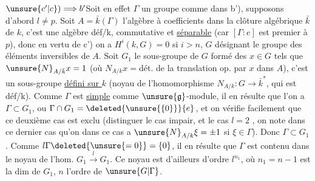 
$\unsure{c'|c})\Longrightarrow b'$\quad Soit en effet $\Gamma$ un groupe comme dans b'), supposons d'abord $l\ne p$.
Soit $A=\bar k(\Gamma)$ l'algèbre  à coefficients dans la clôture algébrique $\bar k$ de $k$,  c'est une algèbre déf/k, commutative et  \uline{séparable} (car $[\Gamma:e]$ est premier à $p$), donc en vertu de c') on a $H^i(k,G)=0$ si $i>n$, $G$ désignant le groupe des éléments inversibles de $A$.
Soit $G_1$ le sous-groupe de $G$ formé des $x\in G$ tels que $\unsure{N}_{A/\bar k}x=1$ (où  $N_{A/k}x={}$dét. de la translation op. par $x$ dans $A$), c'est un sous-groupe \uline{défini sur $k$} (noyau de l'homomorphisme $N_{A/k}:G\longrightarrow\bar k^*$, qui est déf/k).
Comme $\Gamma$ est \uline{simple} comme $\unsure{\mathfrak g}$-module,  il en résulte que  l'on a $\Gamma\subset G_1$, ou $\Gamma\cap G_1=\deleted{\unsure{\{0\}}}\{e\}$, et on vérifie facilement que ce deuxième cas est exclu (distinguer le cas   impair, et le cas $l=2$ \deleted{$\unsure{;} $}, on note dans ce dernier cas qu'on dans ce cas a $\unsure{N}_{A/k}\xi=\pm1$ si $\xi\in\Gamma$).
Donc $\Gamma\subset G_1$. Comme $l\Gamma\deleted{\unsure{=0}}=\{0\}$, il en résulte que $\Gamma$ est contenu dans le noyau de l'hom. $G_1\xrightarrow{l}G_1$.
Ce noyau est d'ailleurs d'ordre $l^{n_1}$, où $n_1=n-1$ est la dim de $G_1$,  $n$ l'ordre de $\unsure{G|\Gamma}$.


